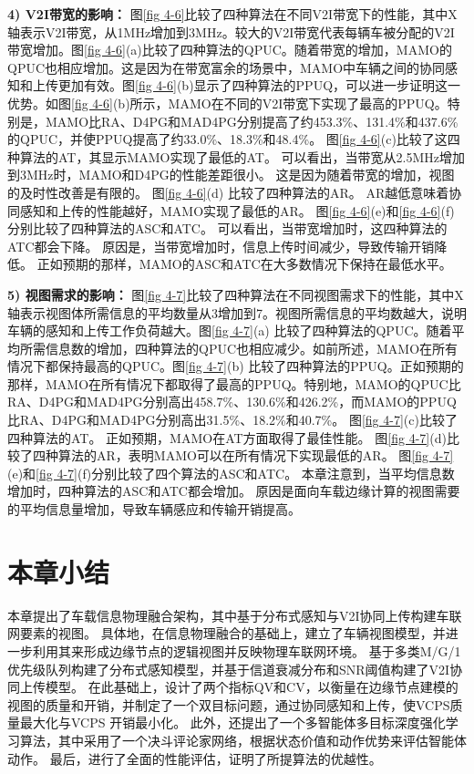 \textbf{4) V2I带宽的影响：}
图\ref{fig 4-6}比较了四种算法在不同V2I带宽下的性能，其中X轴表示V2I带宽，从1MHz增加到3MHz。较大的V2I带宽代表每辆车被分配的V2I带宽增加。图\ref{fig 4-6}(a)比较了四种算法的QPUC。随着带宽的增加，MAMO的QPUC也相应增加。这是因为在带宽富余的场景中，MAMO中车辆之间的协同感知和上传更加有效。图\ref{fig 4-6}(b)显示了四种算法的PPUQ，可以进一步证明这一优势。如图\ref{fig 4-6}(b)所示，MAMO在不同的V2I带宽下实现了最高的PPUQ。特别是，MAMO比RA、D4PG和MAD4PG分别提高了约453.3\%、131.4\%和437.6\%的QPUC，并使PPUQ提高了约33.0\%、18.3\%和48.4\%。
图\ref{fig 4-6}(c)比较了这四种算法的AT，其显示MAMO实现了最低的AT。
可以看出，当带宽从2.5MHz增加到3MHz时，MAMO和D4PG的性能差距很小。
这是因为随着带宽的增加，视图的及时性改善是有限的。
图\ref{fig 4-6}(d) 比较了四种算法的AR。
AR越低意味着协同感知和上传的性能越好，MAMO实现了最低的AR。
图\ref{fig 4-6}(e)和\ref{fig 4-6}(f)分别比较了四种算法的ASC和ATC。
可以看出，当带宽增加时，这四种算法的ATC都会下降。
原因是，当带宽增加时，信息上传时间减少，导致传输开销降低。
正如预期的那样，MAMO的ASC和ATC在大多数情况下保持在最低水平。

\textbf{5) 视图需求的影响：}
图\ref{fig 4-7}比较了四种算法在不同视图需求下的性能，其中X轴表示视图体所需信息的平均数量从3增加到7。视图所需信息的平均数越大，说明车辆的感知和上传工作负荷越大。图\ref{fig 4-7}(a) 比较了四种算法的QPUC。随着平均所需信息数的增加，四种算法的QPUC也相应减少。如前所述，MAMO在所有情况下都保持最高的QPUC。图\ref{fig 4-7}(b) 比较了四种算法的PPUQ。正如预期的那样，MAMO在所有情况下都取得了最高的PPUQ。特别地，MAMO的QPUC比RA、D4PG和MAD4PG分别高出458.7\%、130.6\%和426.2\%，而MAMO的PPUQ比RA、D4PG和MAD4PG分别高出31.5\%、18.2\%和40.7\%。
图\ref{fig 4-7}(c)比较了四种算法的AT。
正如预期，MAMO在AT方面取得了最佳性能。
图\ref{fig 4-7}(d)比较了四种算法的AR，表明MAMO可以在所有情况下实现最低的AR。
图\ref{fig 4-7}(e)和\ref{fig 4-7}(f)分别比较了四个算法的ASC和ATC。
本章注意到，当平均信息数增加时，四种算法的ASC和ATC都会增加。
原因是面向车载边缘计算的视图需要的平均信息量增加，导致车辆感应和传输开销提高。

\section{本章小结}\label{section 4-7}

本章提出了车载信息物理融合架构，其中基于分布式感知与V2I协同上传构建车联网要素的视图。
具体地，在信息物理融合的基础上，建立了车辆视图模型，并进一步利用其来形成边缘节点的逻辑视图并反映物理车联网环境。
基于多类M/G/1优先级队列构建了分布式感知模型，并基于信道衰减分布和SNR阈值构建了V2I协同上传模型。
在此基础上，设计了两个指标QV和CV，以衡量在边缘节点建模的视图的质量和开销，并制定了一个双目标问题，通过协同感知和上传，使VCPS质量最大化与VCPS 开销最小化。
此外，还提出了一个多智能体多目标深度强化学习算法，其中采用了一个决斗评论家网络，根据状态价值和动作优势来评估智能体动作。
最后，进行了全面的性能评估，证明了所提算法的优越性。